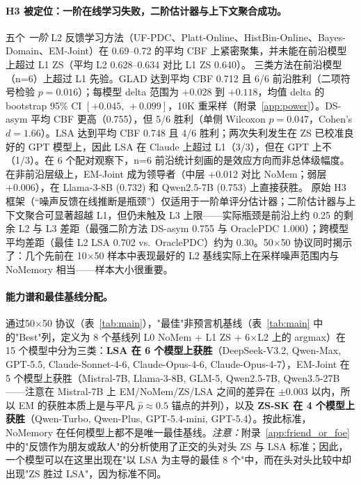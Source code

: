 \documentclass[11pt,a4paper,fontset=fandol]{ctexart}
\begin{document}
\paragraph{H3 被定位：一阶在线学习失败，二阶估计器与上下文聚合成功。} 五个 \emph{一阶} L2 反馈学习方法（UF-PDC、Platt-Online、HistBin-Online、Bayes-Domain、EM-Joint）在 0.69--0.72 的平均 CBF 上紧密聚集，并未能在前沿模型上超过 L1 ZS（平均 L2 0.628--0.634 对比 L1 ZS 0.640）。 三类方法在前沿模型（n=6）上超过 L1 先验。GLAD 达到平均 CBF 0.712 且 6/6 前沿胜利（二项符号检验 $p=0.016$）；每模型 delta 范围为 $+0.028$ 到 $+0.118$，均值 delta 的 bootstrap 95\% CI $[+0.045,\,+0.099]$，10K 重采样（附录~\ref{app:power}）。DS-asym 平均 CBF 更高（0.755），但 5/6 胜利（单侧 Wilcoxon $p=0.047$，Cohen's $d=1.66$）。LSA 达到平均 CBF 0.748 且 4/6 胜利；两次失利发生在 ZS 已校准良好的 GPT 模型上，因此 LSA 在 Claude 上超过 L1（3/3），但在 GPT 上不（1/3）。在 6 个配对观察下，n=6 前沿统计刻画的是效应方向而非总体级幅度。在非前沿层级上，EM-Joint 成为领导者（中层 +0.012 对比 NoMem；弱层 +0.006），在 Llama-3-8B (0.732) 和 Qwen2.5-7B (0.753) 上直接获胜。 原始 H3 框架（“噪声反馈在线推断是瓶颈”）仅适用于一阶单评分估计器；二阶估计器与上下文聚合可显著超越 L1，但仍未触及 L3 上限——实际瓶颈是前沿上约 0.25 的剩余 L2 与 L3 差距（最强二阶方法 DS-asym 0.755 与 OraclePDC 1.000）；跨模型平均差距（最佳 L2 LSA 0.702 vs.\ OraclePDC）约为 0.30。50$\times$50 协议同时揭示了：几个先前在 10$\times$50 样本中表现最好的 L2 基线实际上在采样噪声范围内与 NoMemory 相当——样本大小很重要。

\paragraph{能力谱和最佳基线分配。}
通过50$\times$50 协议（表~\ref{tab:main}），"最佳"非预言机基线（表~\ref{tab:main} 中的"Best"列，定义为 8 个基线列 L0 NoMem + L1 ZS + 6$\times$L2 上的 argmax）在 15 个模型中分为三类：\textbf{LSA 在 6 个模型上获胜}（DeepSeek-V3.2, Qwen-Max, GPT-5.5, Claude-Sonnet-4-6, Claude-Opus-4-6, Claude-Opus-4-7），EM-Joint 在 5 个模型上获胜（Mistral-7B, Llama-3-8B, GLM-5, Qwen2.5-7B, Qwen3.5-27B——注意在 Mistral-7B 上 EM/NoMem/ZS/LSA 之间的差异在 $\pm 0.003$ 以内，所以 EM 的获胜本质上是与平凡 $\hat{p}\approx 0.5$ 锚点的并列），以及 \textbf{ZS-SK 在 4 个模型上获胜}（Qwen-Turbo, Qwen-Plus, GPT-5.4-mini, GPT-5.4）。按此标准，NoMemory 在任何模型上都不是唯一最佳基线。\emph{注意：}附录~\ref{app:friend_or_foe}中的"反馈作为朋友或敌人"的分析使用了正交的头对头 ZS 与 LSA 标准；因此，一个模型可以在这里出现在"以 LSA 为主导的最佳 8 个"中，而在头对头比较中却出现"ZS 胜过 LSA"，因为标准不同。
\end{document}

